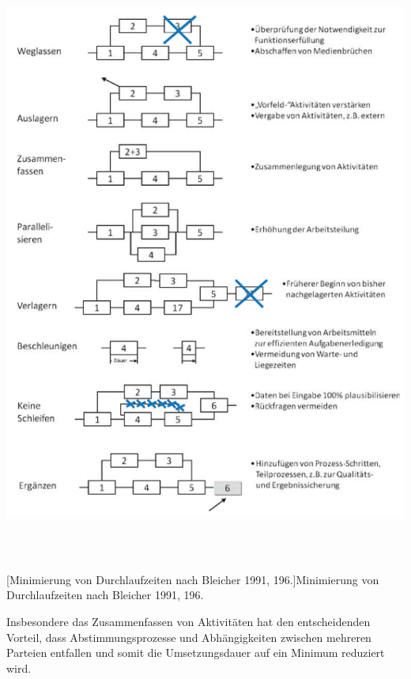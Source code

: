 \documentclass{article}
\begin{document}
\begin{center}
\includegraphics[width=15.5cm,height=20.511cm]{mbaktualisiert-img/mbaktualisiert-img001.png}
[Minimierung von Durchlaufzeiten nach Bleicher 1991, 196.]{Minimierung von Durchlaufzeiten nach
Bleicher 1991, 196.}

\end{center}

\bigskip

Insbesondere das Zusammenfassen von Aktivitäten hat den entscheidenden Vorteil, dass Abstimmungsprozesse und
Abhängigkeiten zwischen mehreren Parteien entfallen und somit die Umsetzungsdauer auf ein Minimum reduziert wird. 


\bigskip
\end{document}
